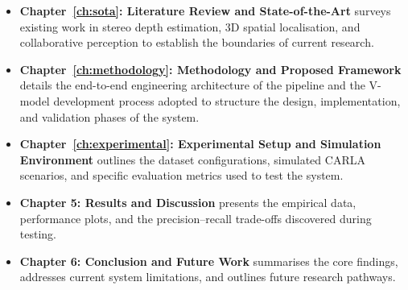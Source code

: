 \begin{itemize}[leftmargin=*,itemsep=3pt]
  \item \textbf{Chapter~\ref{ch:sota}: Literature Review and State-of-the-Art}
  surveys existing work in stereo depth estimation, 3D spatial localisation, and
  collaborative perception to establish the boundaries of current research.
  \item \textbf{Chapter~\ref{ch:methodology}: Methodology and Proposed
  Framework} details the end-to-end engineering architecture of the pipeline and
  the V-model development process adopted to structure the design,
  implementation, and validation phases of the system.
  \item \textbf{Chapter~\ref{ch:experimental}: Experimental Setup and Simulation
  Environment} outlines the dataset configurations, simulated CARLA scenarios, and
  specific evaluation metrics used to test the system.
  \item \textbf{Chapter 5: Results and Discussion} presents the empirical data,
  performance plots, and the precision--recall trade-offs discovered during
  testing.
  \item \textbf{Chapter 6: Conclusion and Future Work} summarises the core
  findings, addresses current system limitations, and outlines future research
  pathways.
\end{itemize}
